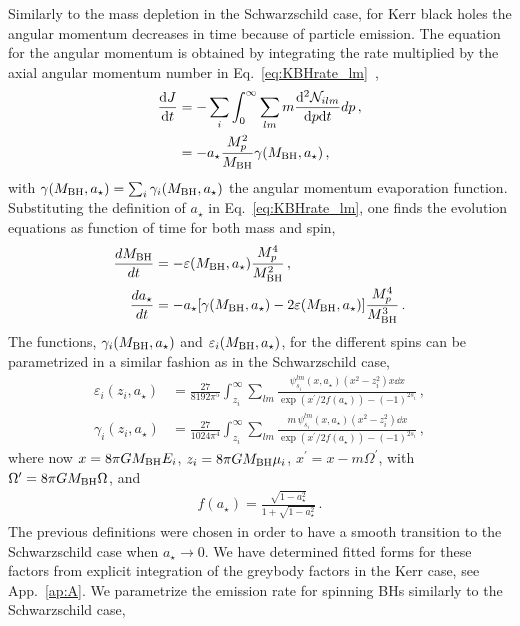 \documentclass[aps,prd,reprint,twocolumn,preprintnumbers,floatfix,nofootinbib]{revtex4-1}
\newcommand{\MBH}{M_{\rm BH}}
\newcommand{\MPL}{M_p}
\newcommand{\as}{a_\star}
\begin{document}
Similarly to the mass depletion in the Schwarzschild case, for Kerr black holes the angular momentum decreases in time because of particle emission. The equation for the angular momentum is obtained by integrating the rate multiplied by the axial angular momentum number in Eq.~\eqref{eq:KBHrate_lm}~\cite{Page:1976df},
\begin{align}
 \frac{\dd J}{\dd t} &= -\sum_i \int_0^\infty \sum_{lm} m \frac{\dd^2 \mathcal{N}_{ilm}}{\dd p\dd t} dp\notag\,,\\
 &=-a_\star\frac{\MPL^2}{\MBH}\gamma(\MBH,a_\star)\,,
\end{align}
with $\gamma(\MBH,a_\star) = \sum_i\gamma_i(\MBH,a_\star)$ the angular momentum evaporation function.
Substituting the definition of $a_\star$ in  Eq.~\eqref{eq:KBHrate_lm}, one finds the evolution equations as function of time for both mass and spin,
\begin{subequations}\label{eq:KerrMA}
\begin{align}
 \frac{d\MBH}{dt} &= - \varepsilon(\MBH, a_\star)\frac{\MPL^4}{\MBH^2}\,,\\
 \frac{da_\star}{dt} &= - a_\star[\gamma(\MBH,a_\star) - 2\varepsilon(\MBH,a_\star)]\frac{\MPL^4}{\MBH^3}\,.
\end{align}
\end{subequations}
The functions, $\gamma_i(\MBH,a_\star)$ and $\varepsilon_i(\MBH,a_\star)$, for the different spins can be parametrized in a similar fashion as in the Schwarzschild case,
\begin{subequations}
\begin{align}
   \varepsilon_i(z_i,\as) &= \frac{27}{8192\pi^5}\int_{z_i}^\infty\sum_{lm}\frac{\psi_{s_i}^{lm}(x,\as)(x^2-z_i^2)x\dd{x}}{\exp(x^\prime/2f(\as))-(-1)^{2s_i}}\,,\\
   \gamma_i(z_i,\as) &= \frac{27}{1024\pi^4}\int_{z_i}^\infty\sum_{lm}\frac{m\,\psi_{s_i}^{lm}(x,\as)(x^2-z_i^2)\dd{x}}{\exp(x^\prime/2f(\as))-(-1)^{2s_i}}\,,
\end{align}
\end{subequations}
where now $x = 8\pi G\MBH E_i$, $z_i = 8\pi G\MBH \mu_i$, $x^\prime = x - m\Omega^\prime$, with $\Omega^\prime = 8\pi G\MBH\Omega$, and
\begin{align*}
    f(\as) = \frac{\sqrt{1-a_\star^2}}{1+\sqrt{1-a_\star^2}}\,.
\end{align*}
The previous definitions were chosen in order to have a smooth transition to the Schwarzschild case when $\as\to 0$. We have determined fitted forms for these factors from explicit integration of the greybody factors in the Kerr case, see App.~\ref{ap:A}. We parametrize the emission rate for spinning BHs similarly to the Schwarzschild case,
\end{document}
